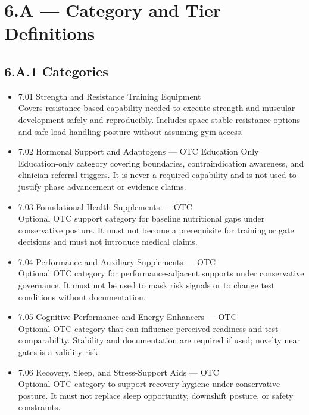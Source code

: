 \documentclass[10pt]{article}
\begin{document}
\section*{6.A — Category and Tier Definitions}
{}

\subsection*{6.A.1 Categories}
{}

\begin{itemize}
\item 7.01 Strength and Resistance Training Equipment\\
Covers resistance-based capability needed to execute strength and muscular development safely and reproducibly. Includes space-stable resistance options and safe load-handling posture without assuming gym access.

\item 7.02 Hormonal Support and Adaptogens — OTC Education Only\\
Education-only category covering boundaries, contraindication awareness, and clinician referral triggers. It is never a required capability and is not used to justify phase advancement or evidence claims.

\item 7.03 Foundational Health Supplements — OTC\\
Optional OTC support category for baseline nutritional gaps under conservative posture. It must not become a prerequisite for training or gate decisions and must not introduce medical claims.

\item 7.04 Performance and Auxiliary Supplements — OTC\\
Optional OTC category for performance-adjacent supports under conservative governance. It must not be used to mask risk signals or to change test conditions without documentation.

\item 7.05 Cognitive Performance and Energy Enhancers — OTC\\
Optional OTC category that can influence perceived readiness and test comparability. Stability and documentation are required if used; novelty near gates is a validity risk.

\item 7.06 Recovery, Sleep, and Stress-Support Aids — OTC\\
Optional OTC category to support recovery hygiene under conservative posture. It must not replace sleep opportunity, downshift posture, or safety constraints.


\end{itemize}
\end{document}
